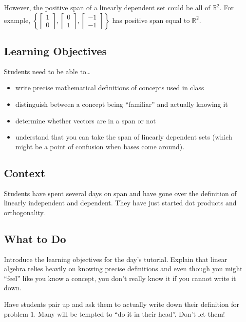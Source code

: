 \documentclass[red]{tutorial}
\newcommand{\R}{\mathbb{R}}
\newcommand{\mat}[1]{\begin{bmatrix}#1\end{bmatrix}}
\theoremstyle{definition}
\theoremstyle{theorem}
\begin{document}
\begin{solutions}
\begin{enumerate}
\begin{enumerate}
					However, the positive span of a linearly dependent set could be all of $\R^2$. For example, $\left\{
						\mat{1\\0},\mat{0\\1},\mat{-1\\-1}\right\}$ has positive span equal to $\R^2$.
			\end{enumerate}
		\end{enumerate}

	\end{solutions}

	\begin{instructions}

\subsection*{Learning Objectives}
	Students need to be able to\ldots
	\begin{itemize}
		\item write precise mathematical definitions of concepts used in class
		\item distinguish between a concept being ``familiar'' and actually knowing it
		\item determine whether vectors are in a span or not
		\item understand that you can take the span of linearly dependent sets (which
			might be a point of confusion when bases come around).
	\end{itemize}

\subsection*{Context}
	Students have spent several days on span and have gone over the definition of linearly independent
		and dependent. They have just started dot products and orthogonality.

\subsection*{What to Do}
	Introduce the learning objectives for the day's tutorial. Explain that linear algebra relies
		heavily on knowing precise definitions and even though you might ``feel'' like
		you know a concept, you don't really know it if you cannot write it down.
	
	Have students pair up and ask them to actually write down their definition for problem 1.
	Many will be tempted to ``do it in their head''. Don't let them!


\end{instructions}
\end{document}
